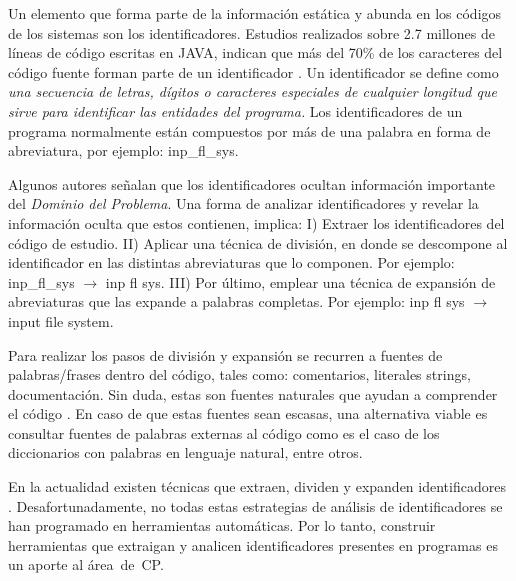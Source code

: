 \documentclass[a4paper,12pt]{article}
\begin{document}


\hspace{0.5cm}Un elemento  que forma parte de la información estática y abunda en los códigos de los sistemas son los identificadores. Estudios realizados sobre 2.7 millones de líneas de código escritas en JAVA, indican que más del 70\% de los caracteres del código fuente forman parte de un identificador \cite{DFPM05,DMDJ13}.
Un identificador se define como \textit{una secuencia de letras, dígitos o caracteres especiales de cualquier longitud que sirve para identificar las entidades del programa.} Los identificadores de un programa normalmente están compuestos por más de una palabra en forma de abreviatura, por ejemplo: \textsf{inp\_fl\_sys}. 

\hspace{0.5cm} Algunos autores \cite{BCPT99,LFBEX07,EZH08,EHPV09} señalan que los identificadores ocultan información importante del \textit{Dominio del Problema}. Una forma de analizar identificadores y revelar la información oculta que estos contienen, implica: I) Extraer los identificadores del código de estudio. II) Aplicar una técnica de división, en donde se descompone al identificador en las distintas abreviaturas que lo componen. Por ejemplo: \textsf{inp\_fl\_sys} $\rightarrow$ \textsf{inp fl sys}. \linebreak III) Por último, emplear una técnica de expansión de abreviaturas que las expande a palabras completas. Por ejemplo: \textsf{inp fl sys} $\rightarrow$ \textsf{input file system}.

\hspace{0.5cm}Para realizar los pasos de división y expansión se recurren a fuentes de palabras/frases dentro del código, tales como: comentarios, literales strings, documentación.
Sin duda, estas son fuentes naturales que ayudan a comprender el código \cite{JDPH08}.
En caso de que estas fuentes sean escasas, una alternativa viable es consultar fuentes de palabras externas al código como es el caso de los diccionarios con palabras en lenguaje natural, entre otros.

\hspace{0.5cm}En la actualidad existen técnicas que extraen, dividen y expanden identificadores \cite{EZH08, EHPV09, BCPT00, HDD06}. Desafortunadamente, no todas estas estrategias de análisis de identificadores se han programado en herramientas automáticas. Por lo tanto, construir herramientas que extraigan y analicen identificadores presentes en programas es un aporte al \mbox{área de CP.} 
\end{document}
